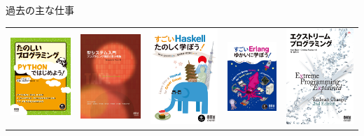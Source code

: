 \begin{frame}[t]{\inhibitglue 過去の主な仕事}
\begin{tabular}{c c c c c}
    \includegraphics[width=.17\textwidth]{images/978-4-274-06944-4.jpg} &
    \includegraphics[width=.17\textwidth]{images/978-4-274-06911-6.jpg} &
    \includegraphics[width=.15\textwidth]{images/978-4-274-06885-0.jpg} &
    \includegraphics[width=.15\textwidth]{images/978-4-274-06912-3.jpg} &
    \includegraphics[width=.15\textwidth]{images/978-4-274-21762-3.jpg} 
  \end{tabular}
\end{frame}

